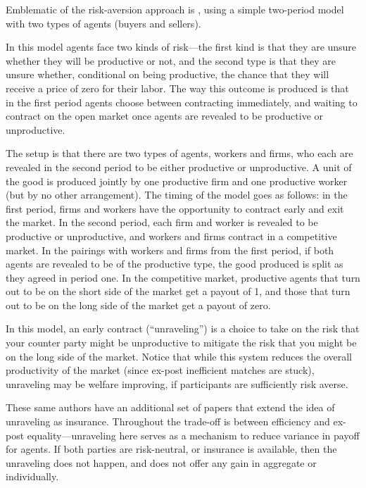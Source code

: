 \documentclass[AER]{AEA}
\begin{document}
Emblematic of the risk-aversion approach is \cite{Li1998}, using a simple two-period model with two types of agents (buyers and sellers).  

In this model agents face two kinds of risk—the first kind is that they are unsure whether they will be productive or not, and the second type is that they are unsure whether, conditional on being productive, the chance that they will receive a price of zero for their labor.  The way this outcome is produced is that in the first period agents choose between contracting immediately, and waiting to contract on the open market once agents are revealed to be productive or unproductive.  

The setup is that there are two types of agents, workers and firms, who each are revealed in the second period to be either productive or unproductive. A unit of the good is produced jointly by one productive firm and one productive worker (but by no other arrangement). The timing of the model goes as follows: in the first period, firms and workers have the opportunity to contract early and exit the market. In the second period, each firm and worker is revealed  to be productive or unproductive, and workers and firms contract in a competitive market.  In the pairings with workers and firms from the first period, if both agents are revealed to be of the productive type, the good produced is split as they agreed in period one. In the competitive market, productive agents that turn out to be on the short side of the market get a payout of 1, and those that turn out to be on the long side of the market get a payout of zero.


In this model, an early contract (``unraveling”)  is a choice to take on the risk that your counter party might be unproductive to mitigate the risk that you might be on the long side of the market.  Notice that while this system reduces the overall productivity of the market (since ex-post inefficient matches are stuck), unraveling may be welfare improving, if participants are sufficiently risk averse.

These same authors have an additional set of papers \cite{Li2000,Li2004}  that extend the idea of unraveling as insurance.  Throughout the trade-off is between efficiency and ex-post equality—unraveling here serves as a mechanism to reduce variance in payoff for agents.  If both parties are risk-neutral, or insurance is available, then the unraveling does not happen, and does not offer any gain in aggregate or individually.
\end{document}

